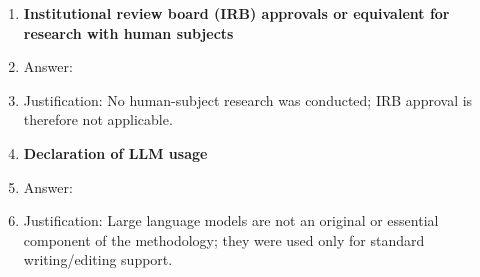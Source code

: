 \begin{enumerate}
\item {\bf Institutional review board (IRB) approvals or equivalent for research with human subjects}  
    \item[] Answer: \answerNA{}  
    \item[] Justification: No human-subject research was conducted; IRB approval is therefore not applicable.  

\item {\bf Declaration of LLM usage}  
    \item[] Answer: \answerNA{}  
    \item[] Justification: Large language models are not an original or essential component of the methodology; they were used only for standard writing/editing support.  

\end{enumerate}
